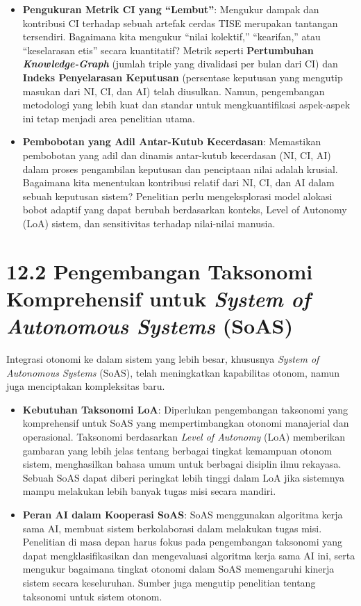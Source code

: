 \documentclass[
  letterpaper,
  DIV=11,
  numbers=noendperiod]{scrreprt}
\providecommand{\tightlist}{%
  \setlength{\itemsep}{0pt}\setlength{\parskip}{0pt}}
\begin{document}
\begin{itemize}
\tightlist
\item
  \textbf{Pengukuran Metrik CI yang ``Lembut''}: Mengukur dampak dan
  kontribusi CI terhadap sebuah artefak cerdas TISE merupakan tantangan
  tersendiri. Bagaimana kita mengukur ``nilai kolektif,'' ``kearifan,''
  atau ``keselarasan etis'' secara kuantitatif? Metrik seperti
  \textbf{Pertumbuhan \emph{Knowledge-Graph}} (jumlah triple yang
  divalidasi per bulan dari CI) dan \textbf{Indeks Penyelarasan
  Keputusan} (persentase keputusan yang mengutip masukan dari NI, CI,
  dan AI) telah diusulkan. Namun, pengembangan metodologi yang lebih
  kuat dan standar untuk mengkuantifikasi aspek-aspek ini tetap menjadi
  area penelitian utama.
\item
  \textbf{Pembobotan yang Adil Antar-Kutub Kecerdasan}: Memastikan
  pembobotan yang adil dan dinamis antar-kutub kecerdasan (NI, CI, AI)
  dalam proses pengambilan keputusan dan penciptaan nilai adalah
  krusial. Bagaimana kita menentukan kontribusi relatif dari NI, CI, dan
  AI dalam sebuah keputusan sistem? Penelitian perlu mengeksplorasi
  model alokasi bobot adaptif yang dapat berubah berdasarkan konteks,
  Level of Autonomy (LoA) sistem, dan sensitivitas terhadap nilai-nilai
  manusia.
\end{itemize}

\section{\texorpdfstring{\textbf{12.2 Pengembangan Taksonomi
Komprehensif untuk \emph{System of Autonomous Systems}
(SoAS)}}{12.2 Pengembangan Taksonomi Komprehensif untuk System of Autonomous Systems (SoAS)}}\label{pengembangan-taksonomi-komprehensif-untuk-system-of-autonomous-systems-soas}

Integrasi otonomi ke dalam sistem yang lebih besar, khususnya
\emph{System of Autonomous Systems} (SoAS), telah meningkatkan
kapabilitas otonom, namun juga menciptakan kompleksitas baru.

\begin{itemize}
\tightlist
\item
  \textbf{Kebutuhan Taksonomi LoA}: Diperlukan pengembangan taksonomi
  yang komprehensif untuk SoAS yang mempertimbangkan otonomi manajerial
  dan operasional. Taksonomi berdasarkan \emph{Level of Autonomy} (LoA)
  memberikan gambaran yang lebih jelas tentang berbagai tingkat
  kemampuan otonom sistem, menghasilkan bahasa umum untuk berbagai
  disiplin ilmu rekayasa. Sebuah SoAS dapat diberi peringkat lebih
  tinggi dalam LoA jika sistemnya mampu melakukan lebih banyak tugas
  misi secara mandiri.
\item
  \textbf{Peran AI dalam Kooperasi SoAS}: SoAS menggunakan algoritma
  kerja sama AI, membuat sistem berkolaborasi dalam melakukan tugas
  misi. Penelitian di masa depan harus fokus pada pengembangan taksonomi
  yang dapat mengklasifikasikan dan mengevaluasi algoritma kerja sama AI
  ini, serta mengukur bagaimana tingkat otonomi dalam SoAS memengaruhi
  kinerja sistem secara keseluruhan. Sumber juga mengutip penelitian
  tentang taksonomi untuk sistem otonom.
\end{itemize}
\end{document}
